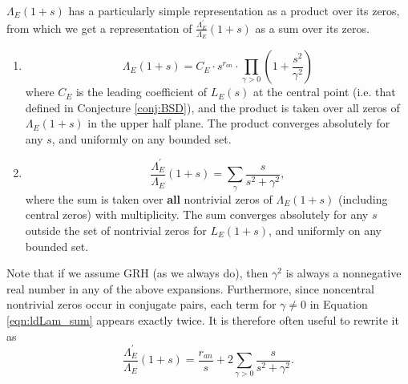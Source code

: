 \documentclass[10pt]{article}
\newcommand{\pr}{^{\prime}}
\newcommand{\Les}{L_E(s)}
\newcommand{\ldLam}[1]{\frac{\Lambda_E\pr}{\Lambda_E}\left(#1\right)}
\begin{document}
$\Lambda_E(1+s)$ has a particularly simple representation as a product over its zeros, from which we get a representation of $\ldLam{1+s}$ as a sum over its zeros.
\begin{proposition}\label{prop:logderiv_zero_rep}  \mbox{}
\begin{enumerate}
\item \begin{equation}\label{eqn:Lams_prod}
\Lambda_E(1+s) = C_E\cdot s^{r_{an}} \cdot \prod_{\gamma > 0} \left(1+\frac{s^2}{\gamma^2}\right) 
\end{equation}
where $C_E$ is the leading coefficient of $\Les$ at the central point (i.e. that defined in Conjecture \ref{conj:BSD}), and the product is taken over all zeros of $\Lambda_E(1+s)$ in the upper half plane. The product converges absolutely for any $s$, and uniformly on any bounded set.
\item \begin{equation}\label{eqn:ldLam_sum}
\ldLam{1+s} = \sum_{\gamma} \frac{s}{s^2+\gamma^2}, 
\end{equation}
where the sum is taken over {\bf all} nontrivial zeros of $\Lambda_E(1+s)$ (including central zeros) with multiplicity. The sum converges absolutely for any $s$ outside the set of nontrivial zeros for $L_E(1+s)$, and uniformly on any bounded set. \\
\end{enumerate}
\end{proposition}

Note that if we assume GRH (as we always do), then $\gamma^2$ is always a nonnegative real number in any of the above expansions. Furthermore,  since noncentral nontrivial zeros occur in conjugate pairs, each term for $\gamma \ne 0$ in Equation \ref{eqn:ldLam_sum} appears exactly twice. It is therefore often useful to rewrite it as
\begin{equation}\label{eqn:ldLam_sum_v2}
\ldLam{1+s} = \frac{r_{an}}{s} + 2 \sum_{\gamma>0} \frac{s}{s^2+\gamma^2}.
\end{equation}
\end{document}
